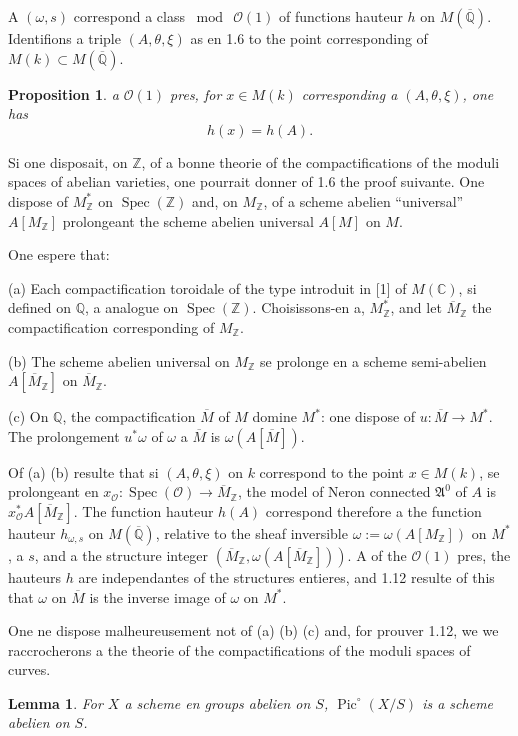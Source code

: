 \documentclass[12pt,a4paper]{article}
\theoremstyle{plain}
\newtheorem{lemma}[theorem]{Lemma}
\newtheorem{proposition}[theorem]{Proposition}
\theoremstyle{definition}
\theoremstyle{remark}
\DeclareMathOperator{\Spec}{Spec}
\DeclareMathOperator{\Pic}{Pic}
\newcommand{\CC}{\mathbb{C}}
\newcommand{\QQ}{\mathbb{Q}}
\newcommand{\ZZ}{\mathbb{Z}}
\newcommand{\cO}{\mathcal{O}}
\newcommand{\fA}{\mathfrak{A}}
\providecommand{\CC}{\mathbb{C}}
\providecommand{\QQ}{\mathbb{Q}}
\providecommand{\ZZ}{\mathbb{Z}}
\providecommand{\cO}{\mathcal{O}}
\providecommand{\fA}{\mathfrak{A}}
\providecommand{\Spec}{\operatorname{Spec}}
\begin{document}
A $(\omega, s)$ correspond a class $\bmod\ \cO(1)$ of functions hauteur $h$ on $M(\overline{\QQ})$. Identifions a triple $(A, \theta, \xi)$ as en 1.6 to the point corresponding of $M(k) \subset M(\overline{\QQ})$.

\begin{proposition}
a $\cO(1)$ pres, for $x \in M(k)$ corresponding a $(A, \theta, \xi)$, one has
\[
h(x) = h(A).
\]
\end{proposition}

Si one disposait, on $\ZZ$, of a bonne theorie of the compactifications of the moduli spaces of abelian varieties, one pourrait donner of 1.6 the proof suivante. One dispose of $M^*_{\ZZ}$ on $\Spec(\ZZ)$ and, on $M_{\ZZ}$, of a scheme abelien ``universal'' $A[M_{\ZZ}]$ prolongeant the scheme abelien universal $A[M]$ on $M$.

One espere that:

(a) Each compactification toroidale of the type introduit in [1] of $M(\CC)$, si defined on $\QQ$, a analogue on $\Spec(\ZZ)$. Choisissons-en a, $M^*_{\ZZ}$, and let $\overline{M}_{\ZZ}$ the compactification corresponding of $M_{\ZZ}$.

(b) The scheme abelien universal on $M_{\ZZ}$ se prolonge en a scheme semi-abelien $A[\overline{M}_{\ZZ}]$ on $\overline{M}_{\ZZ}$.

(c) On $\QQ$, the compactification $\overline{M}$ of $M$ domine $M^*$: one dispose of $u : \overline{M} \to M^*$. The prolongement $u^*\omega$ of $\omega$ a $\overline{M}$ is $\omega(A[\overline{M}])$.

Of (a) (b) resulte that si $(A,\theta,\xi)$ on $k$ correspond to the point $x \in M(k)$, se prolongeant en $x_{\cO} : \Spec(\cO) \to \overline{M}_{\ZZ}$, the model of Neron connected $\fA^0$ of $A$ is $x_{\cO}^* A[\overline{M}_{\ZZ}]$. The function hauteur $h(A)$ correspond therefore a the function hauteur $h_{\omega,s}$ on $M(\overline{\QQ})$, relative to the sheaf inversible $\omega := \omega(A[M_{\ZZ}])$ on $M^*$, a $s$, and a the structure integer $(\overline{M}_{\ZZ}, \omega(A[\overline{M}_{\ZZ}]))$. A of the $\cO(1)$ pres, the hauteurs $h$ are independantes of the structures entieres, and 1.12 resulte of this that $\omega$ on $\overline{M}$ is the inverse image of $\omega$ on $M^*$.

One ne dispose malheureusement not of (a) (b) (c) and, for prouver 1.12, we we raccrocherons a the theorie of the compactifications of the moduli spaces of curves.

\begin{lemma}
For $X$ a scheme en groups abelien on $S$, $\Pic^\circ(X/S)$ is a scheme abelien on $S$.
\end{lemma}
\end{document}
